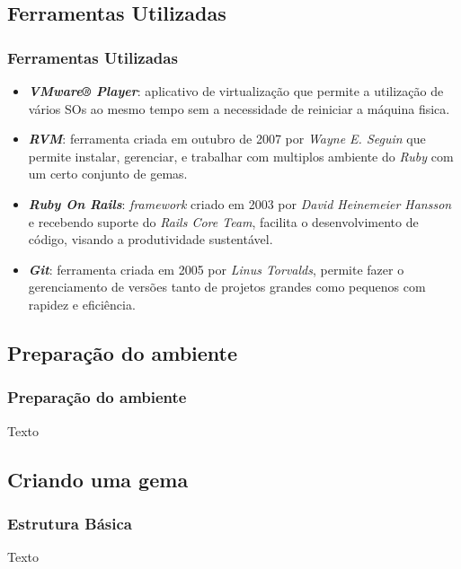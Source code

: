 \subsection{Ferramentas Utilizadas}
\begin{frame}
 \frametitle{Ferramentas Utilizadas}

 \begin{itemize}
 
  \item \emph{\textbf{VMware® Player}}: aplicativo de virtualização que permite a utilização de vários SOs ao 
  mesmo tempo sem a necessidade de reiniciar a máquina fisica.
  
  \item \emph{\textbf{RVM}}: ferramenta criada em outubro de 2007 por \emph{Wayne E. Seguin} que permite instalar,
  gerenciar, e trabalhar com multiplos ambiente do \emph{Ruby} com um certo conjunto de gemas.	
  
  \item \emph{\textbf{Ruby On Rails}}: \emph{framework} criado em 2003 por \emph{David Heinemeier Hansson} e
  recebendo suporte do \emph{Rails Core Team}, facilita o desenvolvimento de código, visando a produtividade 
  sustentável.
  
  \item \emph{\textbf{Git}}: ferramenta criada em 2005 por \emph{Linus Torvalds}, permite fazer o gerenciamento 
  de versões tanto de projetos grandes como pequenos com rapidez e eficiência.
  
 \end{itemize}

 
\end{frame}

\subsection{Preparação do ambiente}
\begin{frame}
 \frametitle{Preparação do ambiente}
 Texto
\end{frame}

\subsection{Criando uma gema}
\begin{frame}
\frametitle{Estrutura Básica}
 Texto
\end{frame}

